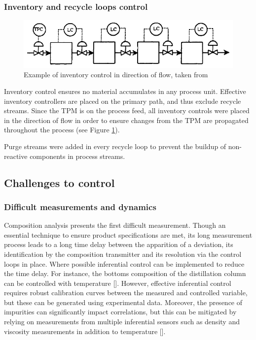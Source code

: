 \subsubsection{Inventory and recycle loops control} %
    \begin{figure}
        \centering
        \includegraphics[width=\linewidth]{chapters/4-operation-control/4-Figures/TPM-Price-1994.png}
        \caption{Example of inventory control in direction of flow, taken from \textcite{}}
        \label{fig:TPM}
    \end{figure}
Inventory control ensures no material accumulates in any process unit. Effective inventory controllers are placed on the primary path, and thus exclude recycle streams. Since the TPM is on the process feed, all inventory controls were placed in the direction of flow in order to ensure changes from the TPM are propagated throughout the process (see Figure \ref{fig:TPM}). 

Purge streams were added in every recycle loop to prevent the buildup of non-reactive components in process streams.  


\subsection{Challenges to control}%

\subsubsection{Difficult measurements and dynamics} %
Composition analysis presents the first difficult measurement. Though an essential technique to ensure product specifications are met, its long measurement process leads to a long time delay between the apparition of a deviation, its identification by the composition transmitter and its resolution via the control loops in place. Where possible inferential control can be implemented to reduce the time delay. For instance, the bottoms composition of the distillation column can be controlled with temperature []. However, effective inferential control requires robust calibration curves between the measured and controlled variable, but these can be generated using experimental data. Moreover, the presence of impurities can significantly impact correlations, but this can be mitigated by relying on measurements from multiple inferential sensors such as density and viscosity measurements in addition to temperature [].

